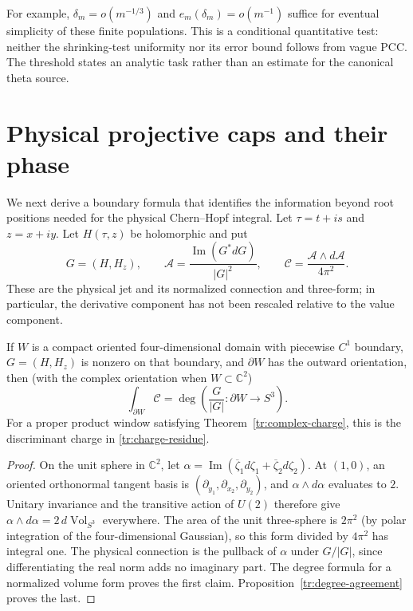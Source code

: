 For example, $\delta_m=o(m^{-1/3})$ and
$e_m(\delta_m)=o(m^{-1})$ suffice for eventual simplicity of these finite
populations. This is a conditional quantitative test: neither the
shrinking-test uniformity nor its error bound follows from vague PCC.
The threshold states an analytic task rather than an estimate for the
canonical theta source.

\section{Physical projective caps and their phase}
\label{sc:caps}

We next derive a boundary formula that identifies the information beyond
root positions needed for the physical Chern--Hopf integral. Let
$\tau=t+is$ and $z=x+iy$. Let $H(\tau,z)$ be holomorphic and put
\begin{equation}
 G=(H,H_z),\qquad
 \mathcal A=\frac{\operatorname{Im}(G^*dG)}{|G|^2},\qquad
 \mathcal C=\frac{\mathcal A\wedge d\mathcal A}{4\pi^2}.
 \label{sc:forms}
\end{equation}
These are the physical jet and its normalized connection and three-form;
in particular, the derivative component has not been rescaled relative
to the value component.

\begin{lemma}
\label{sc:degreeform}
If $W$ is a compact oriented four-dimensional domain with piecewise
$C^1$ boundary, $G=(H,H_z)$ is nonzero on that boundary, and
$\partial W$ has the outward orientation, then
(with the complex orientation when $W\subset\mathbb C^2$)
\[
 \int_{\partial W}\mathcal C
 =\deg\left(\frac G{|G|}:\partial W\longrightarrow S^3\right).
\]
For a proper product window satisfying Theorem~\ref{tr:complex-charge},
this is the discriminant charge in \eqref{tr:charge-residue}.
\end{lemma}
\begin{proof}
On the unit sphere in $\mathbb C^2$, let
$\alpha=\operatorname{Im}(\overline\zeta_1d\zeta_1+
\overline\zeta_2d\zeta_2)$. At $(1,0)$, an oriented orthonormal tangent
basis is $(\partial_{y_1},\partial_{x_2},\partial_{y_2})$, and
$\alpha\wedge d\alpha$ evaluates to $2$. Unitary invariance and the
transitive action of $U(2)$ therefore give
$\alpha\wedge d\alpha=2\,d\operatorname{Vol}_{S^3}$ everywhere.
The area of the unit three-sphere is $2\pi^2$ (by polar integration of
the four-dimensional Gaussian), so this form divided by $4\pi^2$
has integral one. The physical connection is the pullback of $\alpha$
under $G/|G|$, since differentiating the real norm adds no imaginary
part. The degree formula for a normalized volume form proves the first
claim. Proposition~\ref{tr:degree-agreement} proves the last.
\end{proof}

